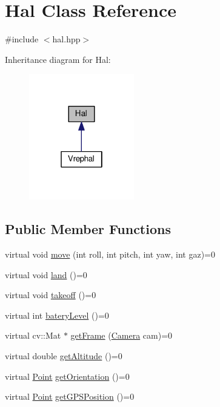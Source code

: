 \hypertarget{class_hal}{}\section{Hal Class Reference}
\label{class_hal}


{\ttfamily \#include $<$hal.\+hpp$>$}



Inheritance diagram for Hal\+:\nopagebreak
\begin{figure}[H]
\begin{center}
\leavevmode
\includegraphics[width=130pt]{class_hal__inherit__graph}
\end{center}
\end{figure}
\subsection*{Public Member Functions}
\begin{DoxyCompactItemize}
\item 
virtual void \hyperlink{class_hal_a91118650b6df6790f56bb8c10230fa0a}{move} (int roll, int pitch, int yaw, int gaz)=0
\item 
virtual void \hyperlink{class_hal_a8376a2668ed62e4d4d70f7b6336e84c4}{land} ()=0
\item 
virtual void \hyperlink{class_hal_ac1968d088d9b905eb99fbe3f77d76757}{takeoff} ()=0
\item 
virtual int \hyperlink{class_hal_a709862946eb7bc952156384187a17c82}{batery\+Level} ()=0
\item 
virtual cv\+::\+Mat $\ast$ \hyperlink{class_hal_a94dbc6927d08b2edc23772a5a0992b76}{get\+Frame} (\hyperlink{hal_8hpp_adc0591c2c6aa3aa864336ece4978ab62}{Camera} cam)=0
\item 
virtual double \hyperlink{class_hal_a9740bffd75eab1959fefea03545d5785}{get\+Altitude} ()=0
\item 
virtual \hyperlink{struct_point}{Point} \hyperlink{class_hal_ad5356f99ad5599b471b819972d4fde86}{get\+Orientation} ()=0
\item 
virtual \hyperlink{struct_point}{Point} \hyperlink{class_hal_af4bb24ecd743845542ff724315511bea}{get\+G\+P\+S\+Position} ()=0
\end{DoxyCompactItemize}


